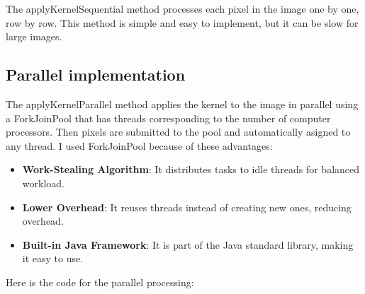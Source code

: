 \documentclass{article}
\begin{document}
\begin{multicols}{2}
    The applyKernelSequential method processes each pixel in the image one by one, row by row. This method is simple and easy to implement, but it can be slow for large images.

    \subsection{Parallel implementation}

    The applyKernelParallel method applies the kernel to the image in parallel using a ForkJoinPool that has threads corresponding to the number of computer processors. Then pixels are submitted to the pool and automatically asigned to any thread. I used ForkJoinPool because of these advantages:

    \begin{itemize}
        \item \textbf{Work-Stealing Algorithm}: It  distributes tasks to idle threads for balanced workload.
        \item \textbf{Lower Overhead}: It reuses threads instead of creating new ones, reducing overhead.
        \item \textbf{Built-in Java Framework}: It is part of the Java standard library, making it easy to use.
    \end{itemize}

    \newblock

    Here is the code for the parallel processing:


\end{multicols}
\end{document}
